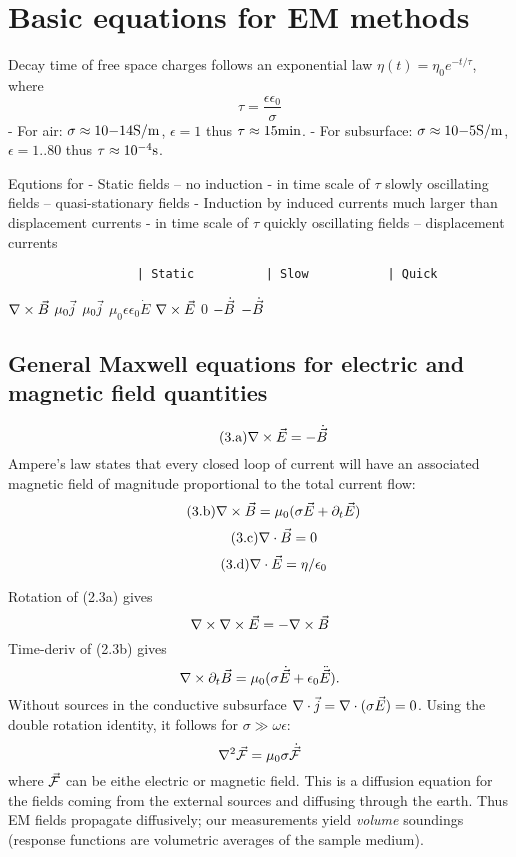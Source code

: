 \section{Basic equations for EM
methods}\label{basic-equations-for-em-methods}

Decay time of free space charges follows an exponential law
\(\eta(t) = \eta_0 e^{-t/\tau}\), where \setcounter{equation}{2}\[
  \tau = \frac{\epsilon \epsilon_0}{\sigma}
\] - For air: \(\sigma \approx 10{-14}\mathrm{S/m}\), \(\epsilon=1\) thus
\(\tau \approx 15\mathrm{min}\). - For subsurface:
\(\sigma \approx 10{-5}\mathrm{S/m}\), \(\epsilon=1..80\) thus
\(\tau \approx 10^{-4}\mathrm{s}\).

Equtions for - Static fields -- no induction - in time scale of \(\tau\)
slowly oscillating fields -- quasi-stationary fields - Induction by
induced currents much larger than displacement currents - in time scale
of \(\tau\) quickly oscillating fields -- displacement currents

\begin{verbatim}
                  | Static          | Slow           | Quick
\end{verbatim}

\(\nabla\times\vec{B}\) \textbar{} \(\mu_0\vec{j}\) \textbar{}
\(\mu_0\vec{j}\) \textbar{} \(\mu_0\epsilon\epsilon_0\dot E\)
\(\nabla\times\vec{E}\) \textbar{} \(0\) \textbar{} \(-\dot{\vec{B}}\)
\textbar{} \(-\dot{\vec{B}}\)

\subsection{General Maxwell equations for electric and magnetic field
quantities}\label{general-maxwell-equations-for-electric-and-magnetic-field-quantities}

\setcounter{equation}{3}\[\tag{3.a}
  \nabla\times\vec{E}  = -\dot{\vec{B}}
\] Ampere's law states that every closed loop of current will have an
associated magnetic field of magnitude proportional to the total current
flow: \setcounter{equation}{3}\[\tag{3.b}
  \nabla\times\vec{B}  = \mu_0(\sigma\vec{E} + \partial_t\vec{E})
\] \setcounter{equation}{3}\[\tag{3.c}
  \nabla\cdot\vec{B}   = 0
\] \setcounter{equation}{3}\[\tag{3.d}
  \nabla\cdot\vec{E}   = \eta/\epsilon_0
\]

Rotation of (2.3a) gives \[
  \nabla\times\nabla\times\vec{E} = -\nabla\times\vec{B}
\] Time-deriv of (2.3b) gives \[
  \nabla\times\partial_t\vec{B} = \mu_0(\sigma\dot{\vec{E}} + \epsilon_0\ddot{\vec{E}}).
\] Without sources in the conductive subsurface
\(\nabla\cdot\vec{j} = \nabla\cdot(\sigma\vec{E}) = 0\). Using the double
rotation identity, it follows for \(\sigma\gg\omega\epsilon\): \setcounter{equation}{6}\[
  \nabla^2\vec{\mathcal{F}} = \mu_0 \sigma \dot{\vec{\mathcal{F}}}
\] where \(\vec{\mathcal{F}}\) can be eithe electric or magnetic field. This is a
diffusion equation for the fields coming from the external sources and
diffusing through the earth. Thus EM fields propagate diffusively; our
measurements yield \emph{volume} soundings (response functions are
volumetric averages of the sample medium).

